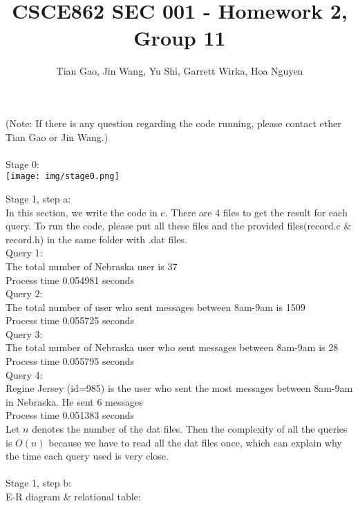 \documentclass[a4paper]{article}
\title{CSCE862 SEC 001 - Homework 2, Group 11}
\author{Tian Gao, Jin Wang, Yu Shi, Garrett Wirka, Hoa Nguyen}
\begin{document}
\maketitle

(Note: If there is any question regarding the code running, please contact ether Tian Gao or Jin Wang.)\\\\

Stage 0:\\
\texttt{[image: img/stage0.png]}

Stage 1, step a:\\
In this section, we write the code in c. There are 4 files to get the result for each query. To run the code, please put all these files and the provided files(record.c \& record.h) in the same folder with .dat files.\\
Query 1:\\
The total number of Nebraska user is 37\\
Process time 0.054981 seconds\\
Query 2:\\
The total number of user who sent messages between 8am-9am is 1509\\
Process time 0.055725 seconds\\
Query 3:\\
The total number of Nebraska user who sent messages between 8am-9am is 28\\
Process time 0.055795 seconds\\
Query 4:\\
Regine Jersey (id=985) is the user who sent the most messages between 8am-9am in Nebraska. He sent 6 messages\\
Process time 0.051383 seconds\\

Let $n$ denotes the number of the dat files. Then the complexity of all the queries is $O(n)$ because we have to read all the dat files once, which can explain why the time each query used is very close.\\\\
Stage 1, step b:\\
E-R diagram \& relational table:\\
\end{document}
